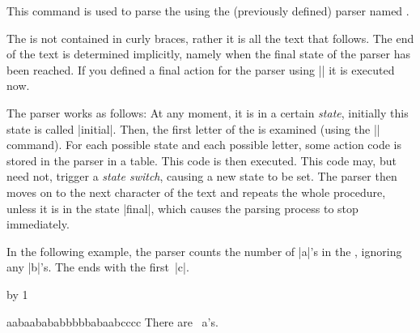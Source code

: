 \begin{command}{\pgfparserparse{}}%
  This command is used to parse the  using the (previously defined)
  parser named .

  The  is not contained in curly braces, rather it is all the text
  that follows. The end of the text is determined implicitly, namely when the
  final state of the parser has been reached. If you defined a final action for
  the parser using |\pgfparserdeffinal| it is executed now.

  The parser works as follows: At any moment, it is in a certain
  \emph{state}, initially this state is called |initial|. Then, the first
  letter of the  is examined (using the |\futurelet| command). For
  each possible state and each possible letter, some action code is stored in
  the parser in a table. This code is then executed. This code may, but need
  not, trigger a \emph{state switch}, causing a new state to be set. The
  parser then moves on to the next character of the text and repeats the
  whole procedure, unless it is in the state |final|, which causes the
  parsing process to stop immediately.

  In the following example, the parser counts the number of |a|'s in the
  , ignoring any |b|'s. The  ends with the first~|c|.
\begin{codeexample}[preamble={\usepgfmodule{parser}}]
\newcount\mycount
{}%
{\advance\mycount by 1\relax}%
%
{} %
%
{}%

aabaabababbbbbabaabcccc
There are \the\mycount\ a's.
\end{codeexample}%
\end{command}%

